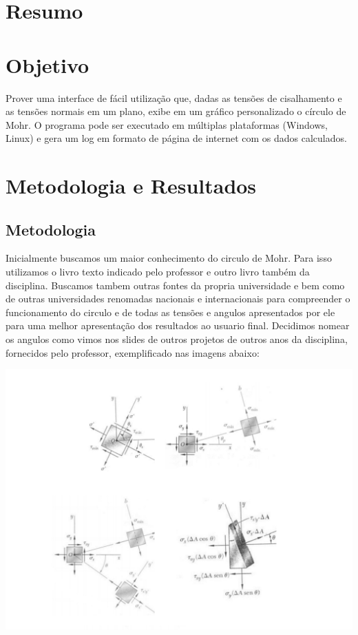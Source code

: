 \documentclass[a4paper]{article}
\begin{document}
\section{Resumo}

\section{Objetivo}
Prover uma interface de fácil utilização que, dadas as tensões de cisalhamento e as tensões normais em um plano, exibe em um gráfico personalizado o círculo de Mohr. O programa pode ser executado em múltiplas plataformas (Windows, Linux) e gera um log em formato de página de internet com os dados calculados. 

\section{Metodologia e Resultados}

\subsection{Metodologia}
Inicialmente buscamos um maior conhecimento do circulo de Mohr. Para isso utilizamos o livro texto indicado pelo professor e outro livro também da disciplina. Buscamos tambem outras fontes da propria universidade e bem como de outras universidades renomadas nacionais e internacionais para compreender o funcionamento do circulo e de todas as tensões e angulos apresentados por ele para uma melhor apresentação dos resultados ao usuario final.
Decidimos nomear os angulos como vimos nos slides de outros projetos de outros anos da disciplina, fornecidos pelo professor, exemplificado nas imagens abaixo:

\includegraphics[scale = 0.4]{imagem1}
\end{document}
